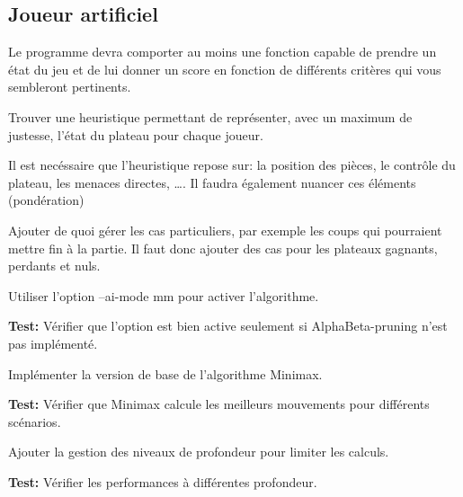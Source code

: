 \documentclass{article}
\begin{document}
\subsection{Joueur artificiel}

\begin{needbox}
    Le programme devra comporter au moins une fonction
    capable de prendre un état du jeu et de lui donner un score en
    fonction de différents critères qui vous sembleront pertinents.
    \begin{subneedbox}
        Trouver une heuristique permettant de représenter, avec un 
        maximum de justesse, l'état du plateau pour chaque joueur.
    \end{subneedbox}
    \begin{subneedbox}
        Il est necéssaire que l'heuristique repose sur: la position des pièces, 
        le contrôle du plateau, les menaces directes, \ldots .
        Il faudra également nuancer ces éléments (pondération)
    \end{subneedbox}
    \begin{subneedbox}
        Ajouter de quoi gérer les cas particuliers, par exemple les coups
        qui pourraient mettre fin à la partie. Il faut donc ajouter des cas
        pour les plateaux gagnants, perdants et nuls.
    \end{subneedbox}
\end{needbox}

\begin{needbox}
    \begin{subneedbox}
        Utiliser l'option --ai-mode mm pour activer l'algorithme.

        \textbf{Test:} Vérifier que l'option est bien active seulement si AlphaBeta-pruning n'est pas implémenté.
    \end{subneedbox}
    
    \begin{subneedbox}
        Implémenter la version de base de l’algorithme Minimax.

        \textbf{Test:} Vérifier que Minimax calcule les meilleurs mouvements pour différents scénarios.
    \end{subneedbox}
    
    \begin{subneedbox}
        Ajouter la gestion des niveaux de profondeur pour limiter les calculs.

        \textbf{Test:} Vérifier les performances à différentes profondeur.
    \end{subneedbox}
\end{needbox}
\end{document}

